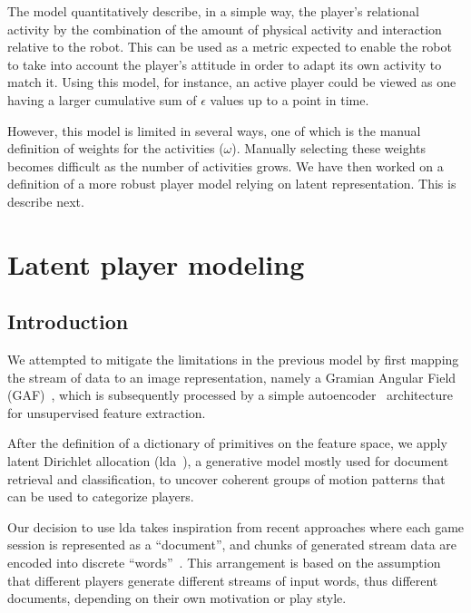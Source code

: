 The model quantitatively describe, in a simple way, the player's relational activity by the combination of the amount of physical activity and interaction relative to the robot. This can be used as a metric expected to enable the robot to take into account the player's attitude in order to adapt its own activity to match it. Using this model, for instance, an active player could be viewed as one having a larger cumulative sum of $\epsilon$ values up to a point in time.

However, this model is limited in several ways, %
one of which is the manual definition of weights for the activities ($\omega$). Manually selecting these weights becomes difficult as the number of activities grows. We have then worked on a definition of a more robust player model relying on latent representation. This is describe next.

\section{Latent player modeling}

\subsection{Introduction} %
We attempted to mitigate the limitations in the previous model by first mapping the stream of data to an image representation, namely a Gramian Angular Field (GAF)~\cite{wang_imaging_2015}, which is subsequently processed by a simple autoencoder~\cite{goodfellow_deep_2016} architecture for unsupervised feature extraction. %

After the definition of a dictionary of primitives on the feature space, we apply latent Dirichlet allocation (\gls{lda}~\cite{blei_latent_2003}), a generative model mostly used for document retrieval and classification, to uncover coherent groups of motion patterns that can be used to categorize players.

Our decision to use \gls{lda} takes inspiration from recent approaches where each game session is represented as a ``document'', and chunks of generated stream data are encoded into discrete ``words''~\cite{smith_mining_2016}. This arrangement is based on the assumption that different players generate different streams of input words, thus different documents, depending on their own motivation or play style. 

